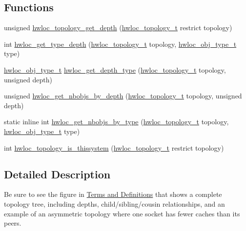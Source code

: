 \subsection*{Functions}
\begin{DoxyCompactItemize}
\item 
 unsigned \hyperlink{a00046_ga8c30b0cec55074eb3ed34e4f2a1a9937}{hwloc\_\-topology\_\-get\_\-depth} (\hyperlink{a00039_ga9d1e76ee15a7dee158b786c30b6a6e38}{hwloc\_\-topology\_\-t} restrict topology) 
\item 
 int \hyperlink{a00046_gaea7c64dd59467f5201ba87712710b14d}{hwloc\_\-get\_\-type\_\-depth} (\hyperlink{a00039_ga9d1e76ee15a7dee158b786c30b6a6e38}{hwloc\_\-topology\_\-t} topology, \hyperlink{a00041_gacd37bb612667dc437d66bfb175a8dc55}{hwloc\_\-obj\_\-type\_\-t} type)
\item 
 \hyperlink{a00041_gacd37bb612667dc437d66bfb175a8dc55}{hwloc\_\-obj\_\-type\_\-t} \hyperlink{a00046_gadd4964764ae7e49231065d58a553fd31}{hwloc\_\-get\_\-depth\_\-type} (\hyperlink{a00039_ga9d1e76ee15a7dee158b786c30b6a6e38}{hwloc\_\-topology\_\-t} topology, unsigned depth) 
\item 
 unsigned \hyperlink{a00046_ga20cfe2456f4cfdd789c9aca6d2fdd69f}{hwloc\_\-get\_\-nbobjs\_\-by\_\-depth} (\hyperlink{a00039_ga9d1e76ee15a7dee158b786c30b6a6e38}{hwloc\_\-topology\_\-t} topology, unsigned depth) 
\item 
static inline int \hyperlink{a00046_gaba821f84ef64282d14577066e6d6547e}{hwloc\_\-get\_\-nbobjs\_\-by\_\-type} (\hyperlink{a00039_ga9d1e76ee15a7dee158b786c30b6a6e38}{hwloc\_\-topology\_\-t} topology, \hyperlink{a00041_gacd37bb612667dc437d66bfb175a8dc55}{hwloc\_\-obj\_\-type\_\-t} type) 
\item 
 int \hyperlink{a00046_ga0d109e33fc7990f62f665d336e5e5111}{hwloc\_\-topology\_\-is\_\-thissystem} (\hyperlink{a00039_ga9d1e76ee15a7dee158b786c30b6a6e38}{hwloc\_\-topology\_\-t} restrict topology) 
\end{DoxyCompactItemize}


\subsection{Detailed Description}
Be sure to see the figure in \hyperlink{a00001}{Terms and Definitions} that shows a complete topology tree, including depths, child/sibling/cousin relationships, and an example of an asymmetric topology where one socket has fewer caches than its peers. 

